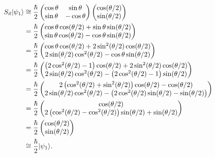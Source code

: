 \documentclass[11pt, letterpaper]{article}
\begin{document}
\begin{align*}
	S_{\vec{n} } \lvert\psi_1\rangle &\cong\frac{\hbar}{2} \begin{pmatrix}
	\cos \theta  & \sin \theta  \\
	\sin \theta  & -\cos \theta 
	\end{pmatrix}\begin{pmatrix}
	\cos (\theta /2) \\
	\sin (\theta /2)
	\end{pmatrix}\\
				  &=\frac{\hbar}{2} \begin{pmatrix}
				  \cos \theta \cos (\theta /2)+\sin \theta \sin (\theta /2) \\
				  \sin \theta \cos (\theta /2)-\cos \theta\sin (\theta /2)
				  \end{pmatrix}\\
				  &=\frac{\hbar}{2}\begin{pmatrix}
				  \cos \theta \cos (\theta /2)+2 \sin^2 (\theta /2)\cos (\theta /2) \\
				  2\sin( \theta/2) \cos^2 (\theta /2)-\cos\theta \sin (\theta /2)
				  \end{pmatrix}\\
				  &=\frac{\hbar}{2}\begin{pmatrix}
					  \left( 2 \cos ^2(\theta /2)-1 \right) \cos (\theta /2)+2 \sin ^2(\theta /2)\cos (\theta /2) \\
				  2 \sin (\theta /2)\cos ^2(\theta /2)-\left( 2 \cos ^2(\theta /2)-1 \right) \sin (\theta /2)
				  \end{pmatrix}\\
				  &=\frac{\hbar}{2}\begin{pmatrix}
				  2\left( \cos ^2(\theta /2) +\sin ^2(\theta /2)\right) \cos (\theta /2)-\cos (\theta /2) \\
				  2 \sin (\theta /2)\cos ^2(\theta /2)-\left(2 \cos ^2(\theta /2)\sin (\theta /2)-\sin (\theta /2)\right)
				  \end{pmatrix}\\
				  &=\frac{\hbar}{2}\begin{pmatrix}
				  \cos (\theta /2) \\
				  2\left( \cos ^2(\theta /2)-\cos ^2(\theta /2) \right) \sin (\theta /2)+\sin (\theta /2)
				  \end{pmatrix}\\
				  &=\frac{\hbar}{2} \begin{pmatrix}
				  \cos (\theta /2) \\
				  \sin (\theta /2)
				  \end{pmatrix}\\
				  &\cong \frac{\hbar}{2}\lvert\psi_1\rangle
.\end{align*}
\end{document}

